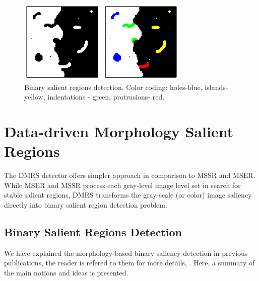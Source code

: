\documentclass{article}
\begin{document}
\begin{figure}[htb]

\begin{minipage}[b]{.48\linewidth}
  \centering
  \centerline{\includegraphics[width=4.0cm]{./Figs/binary_marks}}
\end{minipage}
\begin{minipage}[b]{0.48\linewidth}
  \centering
  \centerline{\includegraphics[width=4.0cm]{./Figs/binary_marks_clean_color_coded}}
\end{minipage}
\vspace{-0.5cm}
\caption{Binary salient regions detection.
Color coding: holes-blue, islands- yellow,
indentations - green, protrusions- red. }
\label{fig:binary_sal}
%
\end{figure}

\section{Data-driven Morphology Salient Regions}
\label{sec:DMSR}
The DMRS detector offers simpler approach in comparison to MSSR and MSER. While MSER and MSSR process each gray-level image level set in search for stable salient regions, DMRS transforms the gray-scale (or color) image saliency directly into binary salient region detection problem.

\subsection{Binary Salient Regions Detection}
\label{ssec:binary}
We have explained the morphology-based binary saliency detection in previous publications, the reader is refered to them for more details, \cite{RangMSSR06, RangHumpb06}. Here, a summary of the main notions and ideas is presented.
\end{document}

